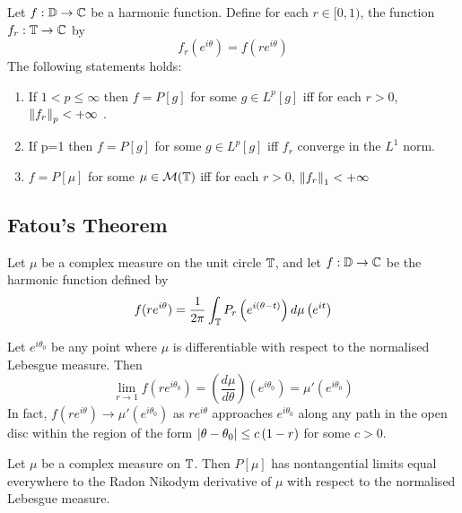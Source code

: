 \begin{theorem}
    Let $f : \mathbb D \to \mathbb C$ be a harmonic function. Define for each $r\in [0,1)$, the function $f_{r} : \mathbb T \to \mathbb C$ by
    \begin{equation*}
	f_{r} \left( e^{i\theta} \right) = f\left( re^{i\theta} \right)
    \end{equation*}
    The following statements holds:
    \begin{enumerate}
	\item If $1 < p \le \infty$ then $f=P[g]$ for some $g \in L^{p} [g]$ iff for each $r > 0$, $\left\lVert f_{r} \right\rVert_{p} < +\infty$ .
	\item If p=1 then $f=P[g]$ for some $g \in L^{p} [g]$ iff $f_{r}$ converge in the $L^{1}$ norm.
	\item $f=P[\mu]$ for some $\mu \in {\cal M} (\mathbb T)$ iff for each $r > 0$, $\left\lVert f_{r} \right\rVert_{1} < +\infty$ 
    \end{enumerate}
    \label{thm:convergence-Poisson}
\end{theorem}
\subsection{Fatou's Theorem}

\begin{theorem}
    Let $\mu$ be a complex measure on the unit circle $\mathbb T$, and let $f: \mathbb D \to \mathbb C$ be the harmonic function defined by
    \begin{align*}
	f(re^{i\theta}) = \frac{1}{2\pi} \int_{\mathbb T} P_{r} \left( e^{i\left( \theta-t \right)} \right) d\mu \left( e^{it} \right)
    \end{align*}

    Let $e^{i\theta_{0}}$ be any point where $\mu$ is differentiable with respect to the normalised Lebesgue measure. Then
    \begin{equation*}
	\lim_{r\to 1} f\left( re^{i\theta_{0}} \right) = \left( \frac{d\mu}{d\theta} \right) \left( e^{i\theta _{0}} \right) = \mu ' \left( e^{i\theta _{0}} \right)
    \end{equation*}
    In fact, $f(re^{i\theta}) \to \mu ' \left( e^{i\theta_{0}} \right)$ as $re^{i\theta}$ approaches $e^{i\theta_{0}}$ along any path in the open disc within the region of the form $\left\lvert \theta - \theta_{0} \right\rvert \le c \left( 1-r \right)$ for some $c> 0$. 
    \label{thm:Fatou-1906}
\end{theorem}

\begin{corollary}
    Let $\mu$ be a complex measure on $\mathbb T$. Then $P[\mu]$ has nontangential limits equal everywhere to the Radon Nikodym derivative of $\mu$ with respect to the normalised Lebesgue measure.
\end{corollary}

